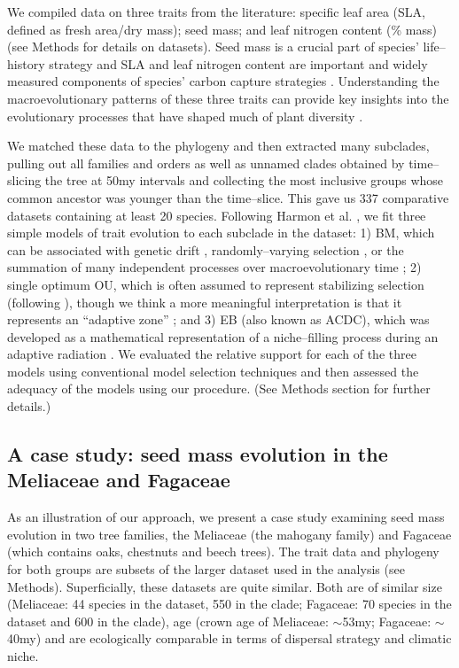 \documentclass[a4paper,12pt]{article}
\begin{document}
We compiled data on three traits from the literature: specific leaf area (SLA, defined as fresh area/dry mass); seed mass; and leaf nitrogen content (\% mass) (see Methods for details on datasets). Seed mass is a crucial part of species' life--history strategy \citep{Leishman2000, Westoby2002} and SLA and leaf nitrogen content are important and widely measured components of species' carbon capture strategies \citep{Wright2004}. Understanding the macroevolutionary patterns of these three traits can provide key insights into the evolutionary processes that have shaped much of plant diversity \citep{ksi}.  

We matched these data to the phylogeny and then extracted many subclades, pulling out all families and orders as well as unnamed clades obtained by time--slicing the tree at 50my intervals and collecting the most inclusive groups whose common ancestor was younger than the time--slice. This gave us 337 comparative datasets containing at least 20 species.
Following Harmon et al. \citep{Harmon2010}, we fit three simple models of trait evolution to each subclade in the dataset: 1) BM, which can be associated with genetic drift \citep{Lande1976, Felsenstein1988, Lynch1990, HansenMartins1996}, randomly--varying selection \citep{Felsenstein1973}, or the summation of many independent processes over macroevolutionary time \citep{HansenMartins1996, Uyeda2011, PennellPE}; 2) single optimum OU, which is often assumed to represent stabilizing selection (following \citep{Lande1976}), though we think a more meaningful interpretation is that it represents an ``adaptive zone'' \citep{Hansen2012book, PennellHarmon}; and 3) EB (also known as ACDC), which was developed as a mathematical representation of a niche--filling process during an adaptive radiation \citep{Blomberg2003, Harmon2010, SlaterPennell}. We evaluated the relative support for each of the three models using conventional model selection techniques and then assessed the adequacy of the models using our procedure. (See Methods section for further details.) 


\subsection{A case study: seed mass evolution in the Meliaceae and Fagaceae }
As an illustration of our approach, we present a case study examining seed mass evolution in two tree families, the Meliaceae (the mahogany family) and Fagaceae (which contains oaks, chestnuts and beech trees). The trait data and phylogeny for both groups are subsets of the larger dataset used in the analysis (see Methods). Superficially, these datasets are quite similar. Both are of similar size (Meliaceae: 44 species in the dataset, 550 in the clade; Fagaceae: 70 species in the dataset and 600 in the clade), age (crown age of Meliaceae: $\sim$53my; Fagaceae: $\sim$40my) and are ecologically comparable in terms of dispersal strategy and climatic niche. 
\end{document}
